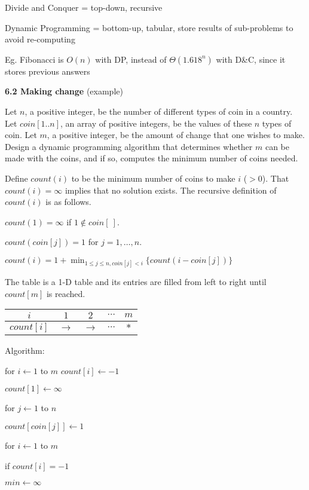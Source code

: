 \documentclass[8pt]{minimal}
\begin{document}
\begin{flushleft}
\begin{multicols}{3}
Divide and Conquer = top-down, recursive

Dynamic Programming = bottom-up, tabular,
store results of sub-problems to avoid re-computing

Eg. Fibonacci is $O(n)$ with DP, instead of $\Theta(1.618^n)$ with D\&C, since it stores previous answers

    \textbf{6.2 Making change} (example)

Let $n$, a positive integer, be the number of different
types of coin in a country. Let $coin[1..n]$, an array of
positive integers, be the values of these $n$ types of coin. Let
$m$, a positive integer, be the amount of change that one wishes to make.
Design a dynamic programming algorithm that determines whether $m$
can be made with the coins, and if so, computes the minimum number of coins
needed.

Define $count(i)$ to be the minimum number of coins to
make $i$ ($>0$). That $count(i)=\infty$ implies that no solution
exists. The recursive definition of $count(i)$ is as follows.

$count(1)=\infty$ if $1\not\in coin[\ ]$.

$count(coin[j])=1$ for $j=1,\ldots,n$.

$count(i)=1+\min_{1\le j\le n,coin[j]<i}\{count(i-coin[j])\}$

\item The table is a 1-D table and its entries are filled from left
to right until $count[m]$ is reached.

\begin{center}
\begin{tabular}{c|c|c|c|c}
$i$ & $1$ & $2$ & $\cdots$ & $m$\\\hline
$count[i]$ & $\rightarrow$ & $\rightarrow$ & $\cdots$ & $*$\\
\end{tabular}
\end{center}

Algorithm:

\qquad for $i\leftarrow 1$ to $m$ $count[i]\leftarrow -1$

\qquad $count[1]\leftarrow\infty$

\qquad for $j\leftarrow 1$ to $n$

\qquad\qquad $count[coin[j]]\leftarrow 1$

\qquad for $i\leftarrow 1$ to $m$

\qquad\qquad if $count[i]=-1$

\qquad\qquad\qquad $min\leftarrow\infty$


\end{multicols}
\end{flushleft}
\end{document}
